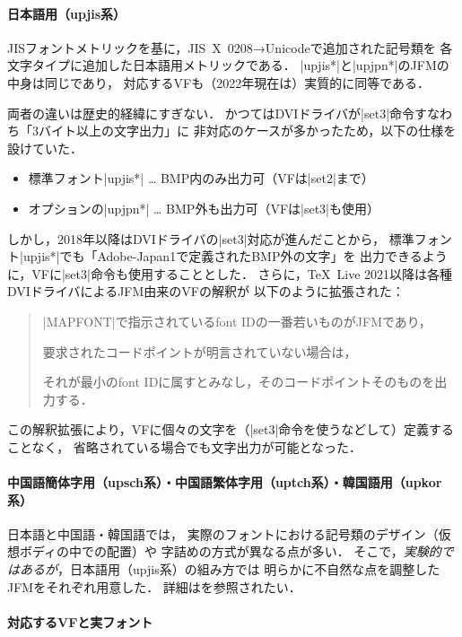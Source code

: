 \documentclass[a4paper,11pt,nomag]{jsarticle}
\begin{document}
\paragraph{日本語用（upjis系）}

JISフォントメトリックを基に，JIS~X~0208→Unicodeで追加された記号類を
各文字タイプに追加した日本語用メトリックである．
|upjis*|と|upjpn*|のJFMの中身は同じであり，
対応するVFも（2022年現在は）実質的に同等である．

\begin{dangerous}
両者の違いは歴史的経緯にすぎない．
かつてはDVIドライバが|set3|命令すなわち「3バイト以上の文字出力」に
非対応のケースが多かったため，以下の仕様を設けていた．
\begin{itemize}
  \item 標準フォント|upjis*| … BMP内のみ出力可（VFは|set2|まで）
  \item オプションの|upjpn*| … BMP外も出力可（VFは|set3|も使用）
\end{itemize}
しかし，2018年以降はDVIドライバの|set3|対応が進んだことから，
標準フォント|upjis*|でも「Adobe-Japan1で定義されたBMP外の文字」を
出力できるように，VFに|set3|命令も使用することとした\cite{upf3}．
さらに，\TeX~Live 2021以降は各種DVIドライバによるJFM由来のVFの解釈が
以下のように拡張された：
\begin{quote}
|MAPFONT|で指示されているfont IDの一番若いものがJFMであり，\par
要求されたコードポイントが明言されていない場合は，\par
それが最小のfont IDに属すとみなし，そのコードポイントそのものを出力する．
\end{quote}
この解釈拡張により，VFに個々の文字を（|set3|命令を使うなどして）定義することなく，
省略されている場合でも文字出力が可能となった\cite{tjb99}．
\end{dangerous}

\paragraph{中国語簡体字用（upsch系）・中国語繁体字用（uptch系）・韓国語用（upkor系）}

日本語と中国語・韓国語では，
実際のフォントにおける記号類のデザイン（仮想ボディの中での配置）や
字詰めの方式が異なる点が多い．
そこで，\emph{実験的ではあるが}，日本語用（upjis系）の組み方では
明らかに不自然な点を調整したJFMをそれぞれ用意した．
詳細は\cite{upf2}を参照されたい．

\paragraph{対応するVFと実フォント}
\end{document}
